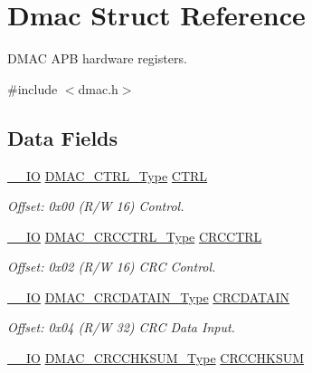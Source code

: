 \hypertarget{struct_dmac}{}\section{Dmac Struct Reference}
\label{struct_dmac}


D\+M\+AC A\+PB hardware registers.  




{\ttfamily \#include $<$dmac.\+h$>$}

\subsection*{Data Fields}
\begin{DoxyCompactItemize}
\item 
\mbox{\hyperlink{core__cm0plus_8h_aec43007d9998a0a0e01faede4133d6be}{\+\_\+\+\_\+\+IO}} \mbox{\hyperlink{union_d_m_a_c___c_t_r_l___type}{D\+M\+A\+C\+\_\+\+C\+T\+R\+L\+\_\+\+Type}} \mbox{\hyperlink{struct_dmac_a58f09c87a750300ff7f9f93be50a0e8c}{C\+T\+RL}}
\begin{DoxyCompactList}\small\item\em Offset\+: 0x00 (R/W 16) Control. \end{DoxyCompactList}\item 
\mbox{\hyperlink{core__cm0plus_8h_aec43007d9998a0a0e01faede4133d6be}{\+\_\+\+\_\+\+IO}} \mbox{\hyperlink{union_d_m_a_c___c_r_c_c_t_r_l___type}{D\+M\+A\+C\+\_\+\+C\+R\+C\+C\+T\+R\+L\+\_\+\+Type}} \mbox{\hyperlink{struct_dmac_a8cff57cdf7087fb7578c13f27baa6756}{C\+R\+C\+C\+T\+RL}}
\begin{DoxyCompactList}\small\item\em Offset\+: 0x02 (R/W 16) C\+RC Control. \end{DoxyCompactList}\item 
\mbox{\hyperlink{core__cm0plus_8h_aec43007d9998a0a0e01faede4133d6be}{\+\_\+\+\_\+\+IO}} \mbox{\hyperlink{union_d_m_a_c___c_r_c_d_a_t_a_i_n___type}{D\+M\+A\+C\+\_\+\+C\+R\+C\+D\+A\+T\+A\+I\+N\+\_\+\+Type}} \mbox{\hyperlink{struct_dmac_accb22162a1c2577d47964bcccdbea0fc}{C\+R\+C\+D\+A\+T\+A\+IN}}
\begin{DoxyCompactList}\small\item\em Offset\+: 0x04 (R/W 32) C\+RC Data Input. \end{DoxyCompactList}\item 
\mbox{\hyperlink{core__cm0plus_8h_aec43007d9998a0a0e01faede4133d6be}{\+\_\+\+\_\+\+IO}} \mbox{\hyperlink{union_d_m_a_c___c_r_c_c_h_k_s_u_m___type}{D\+M\+A\+C\+\_\+\+C\+R\+C\+C\+H\+K\+S\+U\+M\+\_\+\+Type}} \mbox{\hyperlink{struct_dmac_a2ff786653f028d384972f7802372be87}{C\+R\+C\+C\+H\+K\+S\+UM}}

\end{DoxyCompactItemize}
